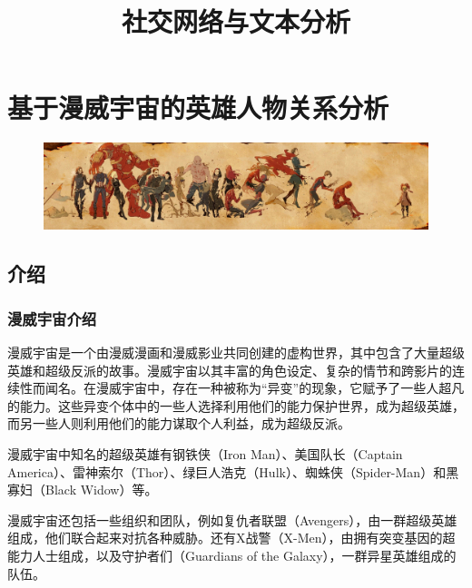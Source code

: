 \documentclass[12pt]{xjtureport}
\title{社交网络与文本分析}
\date{\zhtoday}
\begin{document}
\makecover

\newpage
\tableofcontents
\setcounter{page}{0}
\thispagestyle{empty}


\newpage
\pagestyle{fancy}
\fancyhf{} %
\renewcommand{\headrulewidth}{0pt} %
\rhead{\thepage}


\section{基于漫威宇宙的英雄人物关系分析}

\begin{figure}[!htbp]
    \centering
    \includegraphics[width=\linewidth]{figures/漫威横幅.jpg}
\end{figure}

\subsection{介绍}

\subsubsection{漫威宇宙介绍}

漫威宇宙是一个由漫威漫画和漫威影业共同创建的虚构世界，其中包含了大量超级英雄和超级反派的故事。漫威宇宙以其丰富的角色设定、复杂的情节和跨影片的连续性而闻名。在漫威宇宙中，存在一种被称为“异变”的现象，它赋予了一些人超凡的能力。这些异变个体中的一些人选择利用他们的能力保护世界，成为超级英雄，而另一些人则利用他们的能力谋取个人利益，成为超级反派。

漫威宇宙中知名的超级英雄有钢铁侠（Iron Man）、美国队长（Captain America）、雷神索尔（Thor）、绿巨人浩克（Hulk）、蜘蛛侠（Spider-Man）和黑寡妇（Black Widow）等。

漫威宇宙还包括一些组织和团队，例如复仇者联盟（Avengers），由一群超级英雄组成，他们联合起来对抗各种威胁。还有X战警（X-Men），由拥有突变基因的超能力人士组成，以及守护者们（Guardians of the Galaxy），一群异星英雄组成的队伍。
\end{document}
